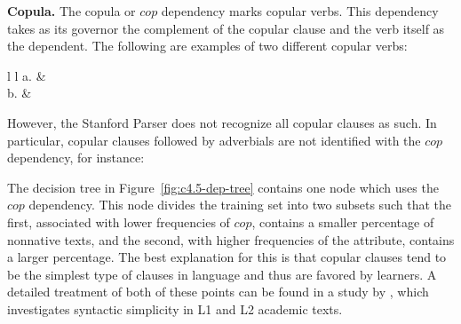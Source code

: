 \documentclass[main.tex]{subfiles}
\begin{document}

\textbf{Copula.} The copula or $cop$ dependency marks copular verbs. This dependency takes as its governor the complement of the copular clause and the verb itself as the dependent. The following \citep[pp. 52-3]{quirk:1985} are examples of two different copular verbs:
\newline\newline\begin{tabular}{ l l }
a. &
\\

b. &
\\
\end{tabular}
\newline

However, the Stanford Parser does not recognize all copular clauses as such. In particular, copular clauses followed by adverbials are not identified with the $cop$ dependency, for instance:

The decision tree in Figure~\ref{fig:c4.5-dep-tree} contains one node which uses the $cop$ dependency. This node divides the training set into two subsets such that the first, associated with lower frequencies of $cop$, contains a smaller percentage of nonnative texts, and the second, with higher frequencies of the attribute, contains a larger percentage. The best explanation for this is that copular clauses tend to be the simplest type of clauses in language and thus are favored by learners. A detailed treatment of both of these points can be found in a study by \citet{hinkel:2003}, which investigates syntactic simplicity in L1 and L2 academic texts.

\end{document}
